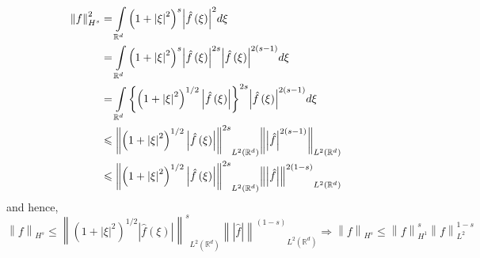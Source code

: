\documentclass[letterpaper,twoside,11pt]{article}
\theoremstyle{mystyle}
\begin{document}
\begin{align*}
  \left\| f \right\|_{{H^s}}^2 &= \int\limits_{{\mathbb{R}^d}} {{{\left( {1 + {{\left| \xi  \right|}^2}} \right)}^s}{{\left| {\hat f\left( \xi  \right)} \right|}^2}d\xi }  \hfill \\
   &= \int\limits_{{\mathbb{R}^d}} {{{\left( {1 + {{\left| \xi  \right|}^2}} \right)}^s}{{\left| {\hat f\left( \xi  \right)} \right|}^{2s}}{{\left| {\hat f\left( \xi  \right)} \right|}^{2\left( {s - 1} \right)}}d\xi }  \hfill \\
   &= \int\limits_{{\mathbb{R}^d}} {{{\left\{ {{{\left( {1 + {{\left| \xi  \right|}^2}} \right)}^{1/2}}\left| {\hat f\left( \xi  \right)} \right|} \right\}}^{2s}}{{\left| {\hat f\left( \xi  \right)} \right|}^{2\left( {s - 1} \right)}}d\xi }  \hfill \\
   &\leqslant {\left\| {{{\left( {1 + {{\left| \xi  \right|}^2}} \right)}^{1/2}}\left| {\hat f\left( \xi  \right)} \right|} \right\|^{2s}}_{{L^2}\left( {{\mathbb{R}^d}} \right)}{\left\| {{{\left| {\hat f} \right|}^{2\left( {s - 1} \right)}}} \right\|_{{L^2}\left( {{\mathbb{R}^d}} \right)}} \hfill \\
   &\leqslant {\left\| {{{\left( {1 + {{\left| \xi  \right|}^2}} \right)}^{1/2}}\left| {\hat f\left( \xi  \right)} \right|} \right\|^{2s}}_{{L^2}\left( {{\mathbb{R}^d}} \right)}{\left\| {\left| {\hat f} \right|} \right\|^{2\left( {1 - s} \right)}}_{{L^2}\left( {{\mathbb{R}^d}} \right)} 
\end{align*}
and hence, 
\[\left\| f \right\|_{{H^s}}^{} \leqslant {\left\| {{{\left( {1 + {{\left| \xi  \right|}^2}} \right)}^{1/2}}\left| {\hat f\left( \xi  \right)} \right|} \right\|^s}_{{L^2}\left( {{\mathbb{R}^d}} \right)}{\left\| {\left| {\hat f} \right|} \right\|^{\left( {1 - s} \right)}}_{{L^2}\left( {{\mathbb{R}^d}} \right)} \Rightarrow \left\| f \right\|_{{H^s}}^{} \leqslant \left\| f \right\|_{{H^1}}^s\left\| f \right\|_{{L^2}}^{1 - s}\]
\end{document}

